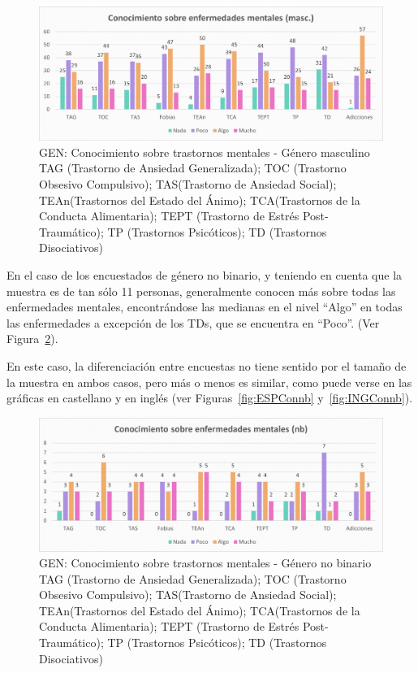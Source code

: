 \documentclass[12pt, a4paper,twoside,titlepage]{book}
\begin{document}
\begin{figure}
\centering
 \includegraphics[width=1\linewidth]{ANEXO Gen/12AnexGENCongmasc}
 \caption{GEN: Conocimiento sobre trastornos mentales - Género masculino\\
 TAG (Trastorno de Ansiedad Generalizada); TOC (Trastorno Obsesivo Compulsivo); TAS(Trastorno de Ansiedad Social); TEAn(Trastornos del Estado del Ánimo); TCA(Trastornos de la Conducta Alimentaria); TEPT (Trastorno de Estrés Post-Traumático); TP (Trastornos Psicóticos); TD (Trastornos Disociativos) }
 \label{fig:Conmasc}
 \end{figure}

En el caso de los encuestados de género no binario, y teniendo en cuenta que la muestra es de tan sólo 11 personas, generalmente conocen más sobre todas las enfermedades mentales, encontrándose las medianas en el nivel “Algo” en todas las enfermedades a excepción de los TDs, que se encuentra en “Poco”. (Ver Figura~\ref{fig:Conbn}). 

En este caso, la diferenciación entre encuestas no tiene sentido por el tamaño de la muestra en ambos casos, pero más o menos es similar, como puede verse en las gráficas en castellano y en inglés (ver Figuras~\ref{fig:ESPConnb} y~\ref{fig:INGConnb}). 


\begin{figure}
\centering
 \includegraphics[width=1\linewidth]{ANEXO Gen/13AnexGENConnb}
 \caption{GEN: Conocimiento sobre trastornos mentales - Género no binario\\
 TAG (Trastorno de Ansiedad Generalizada); TOC (Trastorno Obsesivo Compulsivo); TAS(Trastorno de Ansiedad Social); TEAn(Trastornos del Estado del Ánimo); TCA(Trastornos de la Conducta Alimentaria); TEPT (Trastorno de Estrés Post-Traumático); TP (Trastornos Psicóticos); TD (Trastornos Disociativos) }
 \label{fig:Conbn}
 \end{figure}
\end{document}
